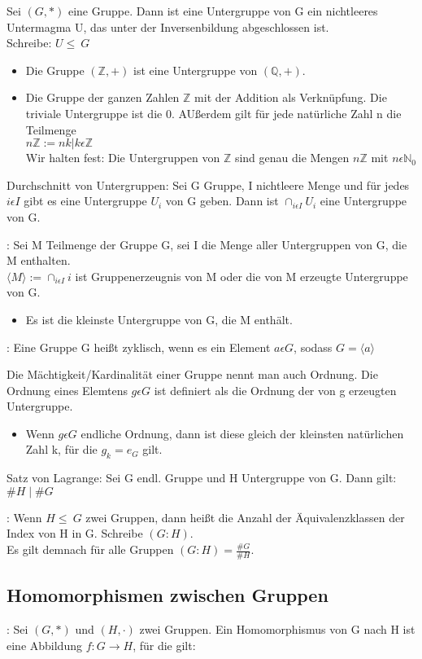 Sei $(G,*)$ eine Gruppe. Dann ist eine Untergruppe von G ein nichtleeres Untermagma U, das unter der Inversenbildung abgeschlossen ist. \\
Schreibe: $U \leq \ G$ 
\begin{itemize}
    \item Die Gruppe $(\mathbb{Z},+)$ ist eine Untergruppe von $(\mathbb{Q},+)$.
    \item Die Gruppe der ganzen Zahlen $\mathbb{Z}$ mit der Addition als Verknüpfung. Die triviale Untergruppe ist die ${0}$. AUßerdem gilt für jede natürliche Zahl n die Teilmenge \\
    $n \mathbb{Z}:={nk \vert k \epsilon \mathbb{Z}}$ \\
    Wir halten fest: Die Untergruppen von $\mathbb{Z}$ sind genau die Mengen $n \mathbb{Z}$ mit $n \epsilon \mathbb{N}_{0}$
\end{itemize}

\bem{} Durchschnitt von Untergruppen: Sei G Gruppe, I nichtleere Menge und für jedes $i \epsilon I$ gibt es eine Untergruppe $U_i$ von G geben. Dann ist $\cap_{i \epsilon I} U_i$ eine Untergruppe von G.

: Sei M Teilmenge der Gruppe G, sei I die Menge aller Untergruppen von G, die M enthalten. \\
$\langle M \rangle:=\cap_{i \epsilon I} i$ 
ist Gruppenerzeugnis von M oder die von M erzeugte Untergruppe von G.
\begin{itemize}
    \item Es ist die kleinste Untergruppe von G, die M enthält. 
\end{itemize}

: Eine Gruppe G heißt zyklisch, wenn es ein Element $a\epsilon G$, sodass $G=\langle{a}\rangle$

 Die Mächtigkeit/Kardinalität einer Gruppe nennt man auch Ordnung. Die Ordnung eines Elemtens $g\epsilon G$ ist definiert als die Ordnung der von g erzeugten Untergruppe.
\begin{itemize}
    \item Wenn $g\epsilon G$ endliche Ordnung, dann ist diese gleich der kleinsten natürlichen Zahl k, für die $g_k=e_G$ gilt.
\end{itemize}

\bem{} Satz von Lagrange: Sei G endl. Gruppe und H Untergruppe von G. Dann gilt: $\#H\mid\#G$

: Wenn $H \leq \ G$ zwei Gruppen, dann heißt die Anzahl der Äquivalenzklassen der Index von H in G. Schreibe $(G:H)$. \\
Es gilt demnach für alle Gruppen $(G:H)=\frac{\#G}{\#H}$.

\subsection{Homomorphismen zwischen Gruppen}
: Sei $(G,*)$ und $(H,\cdot)$ zwei Gruppen. Ein Homomorphismus von G nach H ist eine Abbildung $f:G\rightarrow H$, für die gilt:
